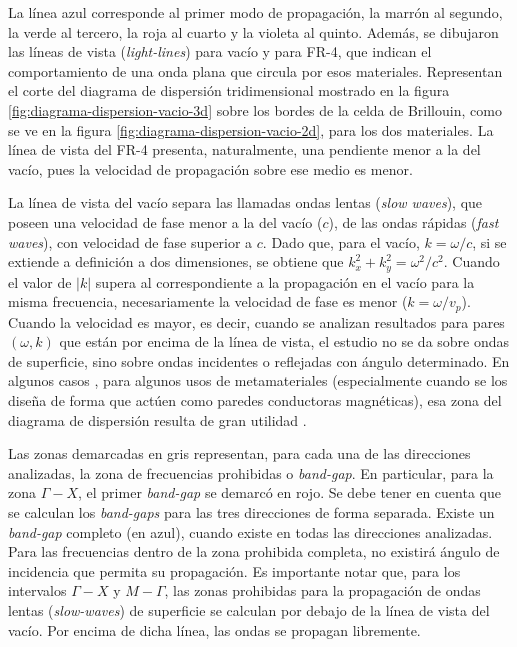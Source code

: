 La línea azul corresponde al primer modo de propagación, la marrón al segundo, la verde al tercero, la roja al cuarto y la violeta al quinto. Además, se dibujaron las líneas de vista (\textit{light-lines}) para vacío y para FR-4, que indican el comportamiento de una onda plana que circula por esos materiales. Representan el corte del diagrama de dispersión tridimensional mostrado en la figura \ref{fig:diagrama-dispersion-vacio-3d} sobre los bordes de la celda de Brillouin, como se ve en la figura \ref{fig:diagrama-dispersion-vacio-2d}, para los dos materiales. La línea de vista del FR-4 presenta, naturalmente, una pendiente menor a la del vacío, pues la velocidad de propagación sobre ese medio es menor.

La línea de vista del vacío separa las llamadas ondas lentas (\textit{slow waves}), que poseen una velocidad de fase menor a la del vacío ($c$), de las ondas rápidas (\textit{fast waves}), con velocidad de fase superior a $c$. Dado que, para el vacío, $k=\omega/c$, si se extiende a definición a dos dimensiones, se obtiene que $k_x^2 + k_y^2 = \omega^2/c^2$. Cuando el valor de $|k|$ supera al correspondiente a la propagación en el vacío para la misma frecuencia, necesariamente la velocidad de fase es menor ($k = \omega / v_p$). Cuando la velocidad es mayor, es decir, cuando se analizan resultados para pares $(\omega,k)$ que están por encima de la línea de vista, el estudio no se da sobre ondas de superficie, sino sobre ondas incidentes o reflejadas con ángulo determinado. En algunos casos \cite{Maci:pole-zero-matching}, para algunos usos de metamateriales (especialmente cuando se los diseña de forma que actúen como paredes conductoras magnéticas), esa zona del diagrama de dispersión resulta de gran utilidad \cite{Yang:EBGAntennas}.

Las zonas demarcadas en gris representan, para cada una de las direcciones analizadas, la zona de frecuencias prohibidas o \textit{band-gap}. En particular, para la zona $\Gamma-X$, el primer \textit{band-gap} se demarcó en rojo. Se debe tener en cuenta que se calculan los \textit{band-gaps} para  las tres direcciones de forma separada. Existe un \textit{band-gap} completo (en azul), cuando existe en todas las direcciones analizadas. Para las frecuencias dentro de la zona prohibida completa, no existirá ángulo de incidencia que permita su propagación. Es importante notar que, para los intervalos $\Gamma-X$ y $M-\Gamma$, las zonas prohibidas para la propagación de ondas lentas (\textit{slow-waves}) de superficie se calculan por debajo de la línea de vista del vacío. Por encima de dicha línea, las ondas se propagan libremente.

